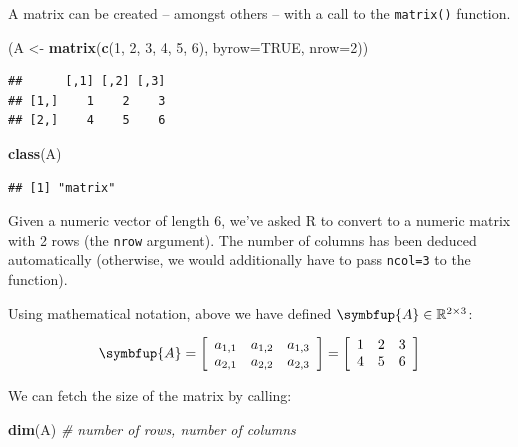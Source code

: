 \documentclass[10pt,b5paper,krantz1]{krantz}
\newenvironment{Shaded}{\begin{snugshade}}{\end{snugshade}}
\newcommand{\CommentTok}[1]{\textcolor[rgb]{0.37,0.37,0.37}{\textit{#1}}}
\newcommand{\DataTypeTok}[1]{\textcolor[rgb]{0.27,0.27,0.27}{#1}}
\newcommand{\DecValTok}[1]{\textcolor[rgb]{0.06,0.06,0.06}{#1}}
\newcommand{\KeywordTok}[1]{\textcolor[rgb]{0.27,0.27,0.27}{\textbf{#1}}}
\newcommand{\NormalTok}[1]{#1}
\newcommand{\OtherTok}[1]{\textcolor[rgb]{0.37,0.37,0.37}{#1}}
\newcommand{\StringTok}[1]{\textcolor[rgb]{0.5,0.5,0.5}{#1}}
\renewcommand{\mathbf}[1]{\symbfup{#1}}
\begin{document}
A matrix can be created -- amongst others -- with a call to the \texttt{matrix()}
function.

\begin{Shaded}
\begin{Highlighting}[]
\NormalTok{(A <-}\StringTok{ }\KeywordTok{matrix}\NormalTok{(}\KeywordTok{c}\NormalTok{(}\DecValTok{1}\NormalTok{, }\DecValTok{2}\NormalTok{, }\DecValTok{3}\NormalTok{, }\DecValTok{4}\NormalTok{, }\DecValTok{5}\NormalTok{, }\DecValTok{6}\NormalTok{), }\DataTypeTok{byrow=}\OtherTok{TRUE}\NormalTok{, }\DataTypeTok{nrow=}\DecValTok{2}\NormalTok{))}
\end{Highlighting}
\end{Shaded}

\begin{verbatim}
##      [,1] [,2] [,3]
## [1,]    1    2    3
## [2,]    4    5    6
\end{verbatim}

\begin{Shaded}
\begin{Highlighting}[]
\KeywordTok{class}\NormalTok{(A)}
\end{Highlighting}
\end{Shaded}

\begin{verbatim}
## [1] "matrix"
\end{verbatim}

Given a numeric vector of length 6, we've asked R to convert to
a numeric matrix with 2 rows (the \texttt{nrow} argument).
The number of columns has been deduced automatically
(otherwise, we would additionally have to pass \texttt{ncol=3} to the function).

Using mathematical notation,
above we have defined \(\mathbf{A}\in\mathbb{R}^{2\times 3}\):

\[
\mathbf{A}=
\left[
\begin{array}{ccc}
a_{1,1} & a_{1,2} & a_{1,3} \\
a_{2,1} & a_{2,2} & a_{2,3} \\
\end{array}
\right]
=
\left[
\begin{array}{ccc}
1 & 2 & 3 \\
4 & 5 & 6 \\
\end{array}
\right]
\]

We can fetch the size of the matrix by calling:

\begin{Shaded}
\begin{Highlighting}[]
\KeywordTok{dim}\NormalTok{(A) }\CommentTok{# number of rows, number of columns}
\end{Highlighting}
\end{Shaded}
\end{document}
